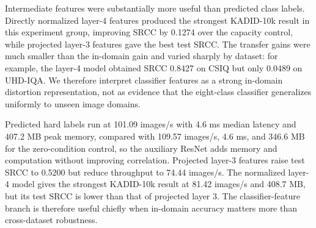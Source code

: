 \documentclass{article}
\begin{document}
\begin{table}[htbp]
\centering
\small
\setlength{\tabcolsep}{4pt}
\caption{Conditioning on frozen classifier features. The capacity control includes a widened image-only head so that total parameter counts are comparable.}
\label{tab:classifier-features}
\end{table}

Intermediate features were substantially more useful than predicted class labels. Directly normalized layer-4 features produced the strongest KADID-10k result in this experiment group, improving SRCC by 0.1274 over the capacity control, while projected layer-3 features gave the best test SRCC. The transfer gains were much smaller than the in-domain gain and varied sharply by dataset: for example, the layer-4 model obtained SRCC 0.8427 on CSIQ but only 0.0489 on UHD-IQA. We therefore interpret classifier features as a strong in-domain distortion representation, not as evidence that the eight-class classifier generalizes uniformly to unseen image domains.

Predicted hard labels run at 101.09 images/s with 4.6 ms median latency and 407.2 MB peak memory, compared with 109.57 images/s, 4.6 ms, and 346.6 MB for the zero-condition control, so the auxiliary ResNet adds memory and computation without improving correlation. Projected layer-3 features raise test SRCC to 0.5200 but reduce throughput to 74.44 images/s. The normalized layer-4 model gives the strongest KADID-10k result at 81.42 images/s and 408.7 MB, but its test SRCC is lower than that of projected layer 3. The classifier-feature branch is therefore useful chiefly when in-domain accuracy matters more than cross-dataset robustness.
\end{document}
